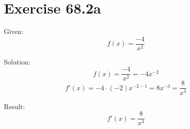 \documentclass[a4paper, 10pt]{scrartcl}
\begin{document}
\section{Exercise 68.2a}

Given:
\[f(x) = \frac{-4}{x^{2}}\]

Solution:
\[f(x) = \frac{-4}{x^{2}} = -4x^{-2}\]
\[f'(x) = -4\cdot(-2)x^{-2 - 1} = 8x^{-3} = \frac{8}{x^{3}}\]

Result:
\[f'(x) = \frac{8}{x^{3}}\]
\end{document}

